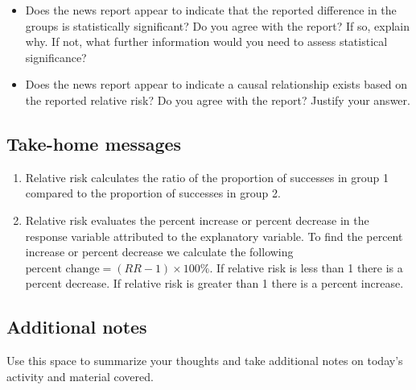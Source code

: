 \documentclass[
]{report}
\providecommand{\tightlist}{%
  \setlength{\itemsep}{0pt}\setlength{\parskip}{0pt}}
\begin{document}
\vspace{0.5in}

\begin{itemize}
\tightlist
\item
  Does the news report appear to indicate that the reported difference in the groups is statistically significant? Do you agree with the report? If so, explain why. If not, what further information would you need to assess statistical significance?
\end{itemize}

\vspace{1in}

\begin{itemize}
\tightlist
\item
  Does the news report appear to indicate a causal relationship exists based on the reported relative risk? Do you agree with the report? Justify your answer.
\end{itemize}

\vspace{1in}
\newpage

\hypertarget{take-home-messages-8}{%
\subsection{Take-home messages}\label{take-home-messages-8}}

\begin{enumerate}
\def\labelenumi{\arabic{enumi}.}
\item
  Relative risk calculates the ratio of the proportion of successes in group 1 compared to the proportion of successes in group 2.
\item
  Relative risk evaluates the percent increase or percent decrease in the response variable attributed to the explanatory variable. To find the percent increase or percent decrease we calculate the following \(\text{percent change}=(RR - 1)\times 100\%\). If relative risk is less than 1 there is a percent decrease. If relative risk is greater than 1 there is a percent increase.
\end{enumerate}

\hypertarget{additional-notes-8}{%
\subsection{Additional notes}\label{additional-notes-8}}

Use this space to summarize your thoughts and take additional notes on today's activity and material covered.
\end{document}
